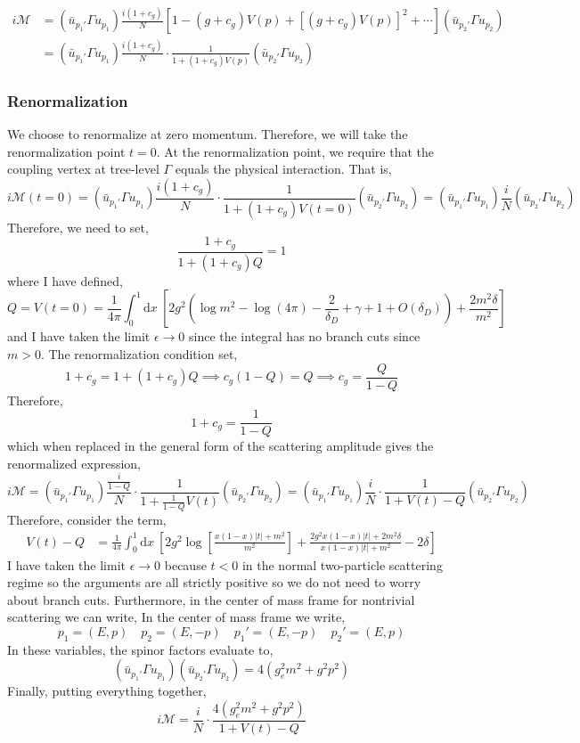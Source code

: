 \documentclass[12pt]{article}
\renewcommand{\d}[1]{ \mathrm{d}#1 \:}
\begin{document}
\begin{align*}
i \mathcal{M} & = (\bar{u}_{p_1'} \Gamma u_{p_1}) \frac{i(1 + c_g)}{N} \left[ 1 - (g + c_g) V(p) + [(g + c_g) V(p)]^2 + \cdots \right] (\bar{u}_{p_2'} \Gamma u_{p_2}) 
\\
& = (\bar{u}_{p_1'} \Gamma u_{p_1}) \frac{i(1 + c_g)}{N} \cdot \frac{1}{1 + (1 + c_g) V(p)} (\bar{u}_{p_2'} \Gamma u_{p_2}) 
\end{align*}


\subsubsection{Renormalization}

We choose to renormalize at zero momentum. Therefore, we will take the renormalization point $t = 0$. At the renormalization point, we require that the coupling vertex at tree-level $\Gamma$ equals the physical interaction. That is,
\[ i \mathcal{M}(t = 0) = (\bar{u}_{p_1'} \Gamma u_{p_1}) \frac{i(1 + c_g)}{N} \cdot \frac{1}{1 + (1 + c_g) V(t = 0)} (\bar{u}_{p_2'} \Gamma u_{p_2}) = (\bar{u}_{p_1'} \Gamma u_{p_1}) \frac{i}{N} (\bar{u}_{p_2'} \Gamma u_{p_2}) \]
Therefore, we need to set,
\[ \frac{1 + c_g}{1 + (1 + c_g) Q} = 1 \]
where I have defined,
\[ Q = V(t = 0) = \frac{1}{4 \pi} \int_0^1 \d{x} \left[ 2 g^2 \left(\log{ m^2 } - \log{(4 \pi)} - \frac{2}{\delta_D} + \gamma + 1 + O(\delta_D) \right) + \frac{ 2 m^2 \delta }{ m^2 } \right] \]
and I have taken the limit $\epsilon \to 0$ since the integral has no branch cuts since $m > 0$. The renormalization condition set,
\[ 1 + c_g = 1 + (1 + c_g) Q \implies c_g(1 - Q) = Q \implies c_g = \frac{Q}{1 - Q} \]
Therefore,
\[ 1 + c_g = \frac{1}{1 - Q} \]
which when replaced in the general form of the scattering amplitude gives the renormalized expression,
\[ i \mathcal{M} = (\bar{u}_{p_1'} \Gamma u_{p_1}) \frac{\frac{i}{1 - Q}}{N} \cdot \frac{1}{1 + \frac{1}{1 - Q} V(t)} (\bar{u}_{p_2'} \Gamma u_{p_2}) = (\bar{u}_{p_1'} \Gamma u_{p_1}) \frac{i}{N} \cdot \frac{1}{1 + V(t) - Q} (\bar{u}_{p_2'} \Gamma u_{p_2}) 
\]
Therefore, consider the term,
\begin{align*}
V(t) - Q & = \frac{1}{4 \pi} \int_0^1 \d{x} \left[ 2 g^2 \log \left[ \frac{x(1 - x) |t| + m^2}{m^2} \right] + \frac{2g^2 x(1-x) |t| + 2 m^2 \delta}{x(1-x) |t| + m^2} - 2 \delta \right]
\end{align*}
I have taken the limit $\epsilon \to 0$ because $t < 0$ in the normal two-particle scattering regime so the arguments are all strictly positive so we do not need to worry about branch cuts. Furthermore, in the center of mass frame for nontrivial scattering we can write,
In the center of mass frame we write,
\[ p_1 = (E, p) \quad p_2 = (E, -p) \quad p_1' = (E, -p) \quad p_2' = (E, p) \]
In these variables, the spinor factors evaluate to,
\[  (\bar{u}_{p_1'} \Gamma u_{p_1})(\bar{u}_{p_2'} \Gamma u_{p_2}) = 4 \left( g_e^2 m^2 + g^2 p^2 \right) \]
Finally, putting everything together,
\[ i \mathcal{M} = \frac{i}{N} \cdot \frac{4 \left( g_e^2 m^2 + g^2 p^2 \right)}{1 + V(t) - Q} \]
\end{document}
